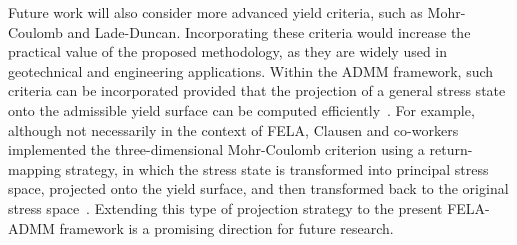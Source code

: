 Future work will also consider more advanced yield criteria, such as Mohr-Coulomb and Lade-Duncan. Incorporating these criteria would increase the practical value of the proposed methodology, as they are widely used in geotechnical and engineering applications. Within the ADMM framework, such criteria can be incorporated provided that the projection of a general stress state onto the admissible yield surface can be computed efficiently~\cite{daSilva_2020, 3DLD}. For example, although not necessarily in the context of FELA, Clausen and co-workers implemented the three-dimensional Mohr-Coulomb criterion using a return-mapping strategy, in which the stress state is transformed into principal stress space, projected onto the yield surface, and then transformed back to the original stress space~\cite{Clausen_2007}. Extending this type of projection strategy to the present FELA-ADMM framework is a promising direction for future research.




